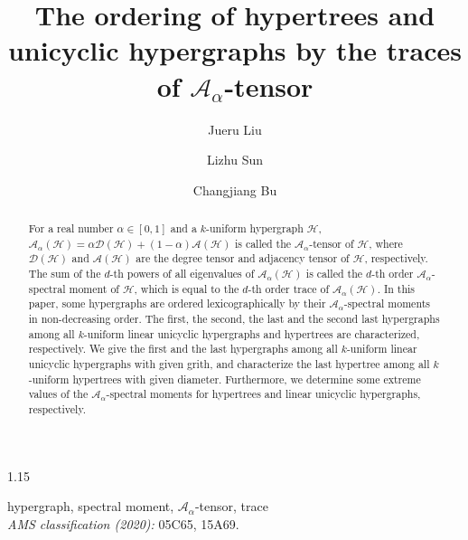 \documentclass[preprint,12pt]{elsarticle1}
\numberwithin{equation}{section}
\begin{document}
\begin{spacing}{1.15}
\begin{frontmatter}
\title{The ordering of hypertrees and unicyclic hypergraphs by the traces of $\mathcal{A}_{\alpha}$-tensor}

\author{Jueru Liu}
\author{Lizhu Sun}
\author{Changjiang Bu}
\address{School of Mathematical Sciences, Harbin Engineering University, Harbin 150001, PR China}



\begin{abstract}
For a real number $\alpha\in[0,1]$ and a $k$-uniform hypergraph $\mathcal{H}$, $\mathcal{A}_{\alpha}(\mathcal{H})=\alpha\mathcal{D}(\mathcal{H})+(1-\alpha)\mathcal{A}(\mathcal{H})$ is called the $\mathcal{A}_{\alpha}$-tensor of $\mathcal{H}$, where $\mathcal{D}(\mathcal{H})$ and $\mathcal{A}(\mathcal{H})$ are the degree tensor and adjacency tensor of $\mathcal{H}$, respectively.
The sum of the $d$-th powers of all eigenvalues of $\mathcal{A}_{\alpha}(\mathcal{H})$ is called the $d$-th order $\mathcal{A}_{\alpha}$-spectral moment of $\mathcal{H}$, which is equal to the $d$-th order trace of $\mathcal{A}_{\alpha}(\mathcal{H})$.
In this paper, some hypergraphs are ordered lexicographically by their $\mathcal{A}_{\alpha}$-spectral moments in non-decreasing order.
The first, the second, the last and the second last hypergraphs among all $k$-uniform linear unicyclic hypergraphs and hypertrees are characterized, respectively.
We give the first and the last hypergraphs among all $k$-uniform linear unicyclic hypergraphs with given grith,
and characterize the last hypertree among all $k$-uniform hypertrees with given diameter.
Furthermore, we determine some extreme values of the $\mathcal{A}_{\alpha}$-spectral moments for hypertrees and linear unicyclic hypergraphs, respectively.
\end{abstract}


\begin{keyword}
hypergraph, spectral moment, $\mathcal{A}_{\alpha}$-tensor, trace
\\
\emph{AMS classification (2020):}
05C65, 15A69.
\end{keyword}
\end{frontmatter}




\end{spacing}
\end{document}
